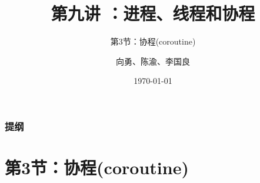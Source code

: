 



\title[第9讲]{第九讲 ：进程、线程和协程} %
\subtitle{第3节：协程(coroutine)}
\author{向勇、陈渝、李国良} %
\date{\today} %




\begin{frame}
\titlepage %
\end{frame}

\begin{frame}
\frametitle{提纲} %
\tableofcontents %
\end{frame}
\section{第3节：协程(coroutine)}%
